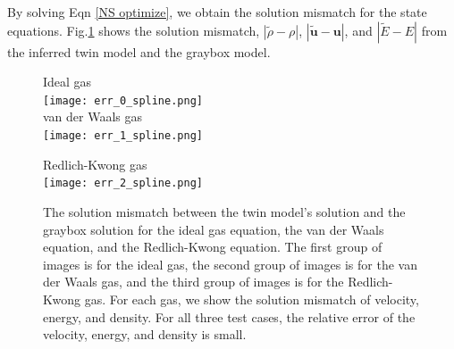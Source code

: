 \documentclass{paper1}
\begin{document}
By solving Eqn \eqref{NS optimize}, we obtain the solution mismatch for the state equations.
Fig.\ref{fig:NS sol err} shows the solution mismatch,
 $\left|\tilde{\rho} -\rho\right|$, $\left|\tilde{\boldsymbol{u}}- \boldsymbol{u}\right|$, 
and $\left|\tilde{E}-E\right|$
from the inferred twin model and the graybox model.
\begin{figure}
    \centering
    Ideal gas\\
    \texttt{[image: err\_0\_spline.png]}\\
    van der Waals gas\\
    \texttt{[image: err\_1\_spline.png]}\\
\end{figure}
\begin{figure}
    \centering
    Redlich-Kwong gas\\
    \texttt{[image: err\_2\_spline.png]}\\
    \caption{
    \label{fig:NS sol err}
    The solution mismatch between the twin model's solution and the graybox solution for the
    ideal gas equation, the van der Waals equation, and the Redlich-Kwong equation. 
    The first group of images is for the ideal gas, the second group of images is for the van der Waals
    gas, and the third group of images is for the Redlich-Kwong gas. For each gas, we show 
    the solution mismatch of velocity, energy, and density. For all
    three test cases, the relative error of the velocity, energy, and density is small.}
\end{figure}
\end{document}
